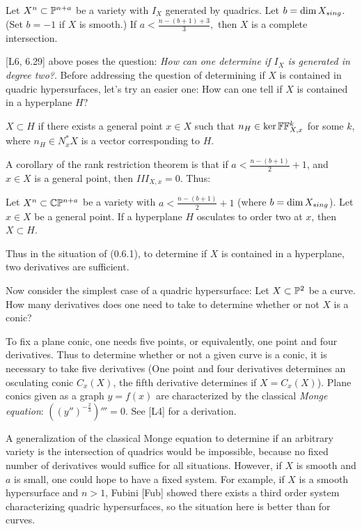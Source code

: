 Let  $X^n\subset\Bbb P^{n+a}$ be a variety
with $I_X$ generated by quadrics.   Let $b=\text{dim}\,
X_{sing}$. (Set $b=-1$ if $X$ is smooth.)
If
$a<\frac{n-(b+1)+3}{3},
$
then $X$ is a complete intersection.
\endproclaim
 

 

[L6, 6.29] above poses the question: {\it How can one determine
if $I_X$ is generated in degree two?}. Before addressing the
question of determining if
$X$ is contained in quadric hypersurfaces, 
let's try an easier one: How can one
tell if
$X$ is contained in a hyperplane $H$?

$X\subset H$ if there exists a general point $x\in X$ such that
$n_H\in \text{ker}\,\Bbb F\Bbb F^{k}_{X,x}$ for some $k$, where $n_H\in N^*_xX$ is
a vector corresponding to $H$.

A corollary of the  rank restriction theorem is that if
$a<\frac {n-(b+1)}2+1$, and $x\in X$ is a general point,
then $III_{X,x}=0$. Thus:

Let $X^n\subset\Bbb C\Bbb P^{n+a}$ be a
variety with $a<\frac
{n-(b+1)}2+1$ (where $b=\text{dim}\, X_{sing}$). Let $x\in X$ be a general point.
 If a hyperplane  $H$ osculates to
 order two at  $x$, then $X\subset H$.
\endproclaim

Thus in the situation of (0.6.1), to determine if $X$ is contained in a
hyperplane, two derivatives are sufficient.

Now consider the simplest case of a quadric hypersurface: Let
$X\subset\Bbb P^{2}$ be a curve. How many derivatives does one need
to take to determine whether or not $X$ is a conic?


  To fix a plane conic,
one needs five points,
or equivalently, one point and four derivatives. Thus
to determine whether or not a given curve is a conic, it is necessary
to take five derivatives (One point and four derivatives
determines an osculating conic
$C_x(X)$, the fifth
derivative determines if $X=C_x(X)$). Plane conics
given as a graph
$y=f(x)$ are characterized by the classical {\it Monge equation}:
$
 ((y'')^{-\frac 23})'''=0.  
$
   See   [L4] for a derivation. 

A generalization of the classical Monge equation to determine if
an arbitrary variety is the intersection of quadrics would be
impossible, because no fixed number of derivatives would suffice
for all situations.  However, if 
$X$ is smooth and $a$ is small, one could hope
to have a fixed system. For example, if $X$ is a smooth hypersurface
and $n>1$,  Fubini [Fub] showed there exists a third order
system characterizing quadric hypersurfaces, so the situation here is
  better than for curves.

